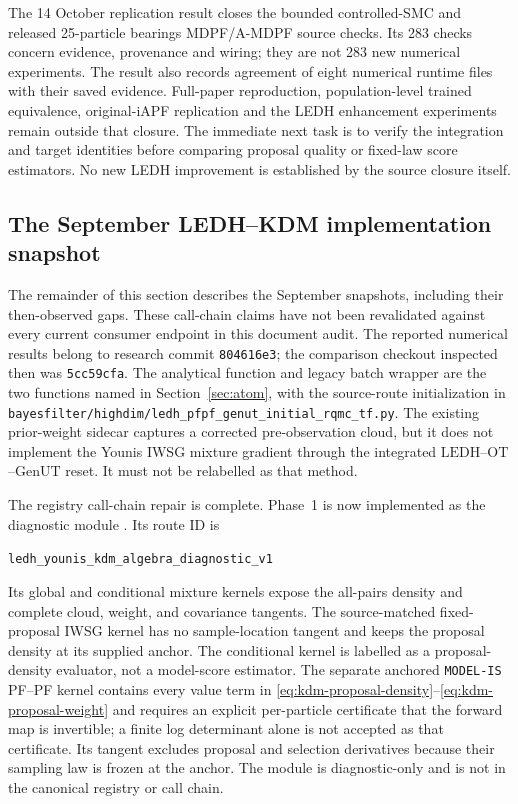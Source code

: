 \documentclass[11pt]{article}
\newcommand{\LEDH}{\ensuremath{\mathrm{LEDH}}}
\newcommand{\GenUT}{\ensuremath{\mathrm{GenUT}}}
\newcommand{\OT}{\ensuremath{\mathrm{OT}}}
\begin{document}
The 14 October replication result closes the bounded controlled-SMC and
released 25-particle bearings MDPF/A-MDPF source checks. Its 283 checks concern
evidence, provenance and wiring; they are not 283 new numerical experiments.
The result also records agreement of eight numerical runtime files with
their saved evidence. Full-paper reproduction, population-level trained
equivalence, original-iAPF replication and the LEDH enhancement experiments
remain outside that closure. The immediate next task is to verify the
integration and target identities before comparing proposal quality or
fixed-law score estimators. No new LEDH improvement is established by the
source closure itself.

\subsection{The September LEDH--KDM implementation snapshot}

The remainder of this section describes the September snapshots, including
their then-observed gaps. These call-chain claims have not been revalidated
against every current consumer endpoint in this document audit. The
reported numerical results belong to research commit \texttt{804616e3}; the
comparison checkout inspected then was \texttt{5cc59cfa}. The analytical
function and legacy batch wrapper are the two functions named in
Section~\ref{sec:atom}, with the source-route initialization in
\texttt{bayesfilter/highdim/ledh\_pfpf\_genut\_initial\_rqmc\_tf.py}.  The
existing prior-weight sidecar captures a corrected pre-observation cloud, but
it does not implement the Younis IWSG mixture gradient through the integrated
\LEDH{}--\OT{}--\GenUT{} reset.  It must not be relabelled as that method.

The registry call-chain repair is complete.  Phase~1 is now implemented as the
diagnostic module
.  Its route ID is
\begin{center}
\texttt{ledh\_younis\_kdm\_algebra\_}\texttt{diagnostic\_v1}
\end{center}
Its global and
conditional mixture kernels expose the all-pairs density and complete cloud,
weight, and covariance tangents.  The source-matched fixed-proposal IWSG
kernel has no sample-location tangent and keeps the proposal density at its
supplied anchor.  The conditional kernel is labelled as a proposal-density
evaluator, not a model-score estimator.  The separate anchored
\texttt{MODEL-IS} PF--PF kernel contains every value term in
\eqref{eq:kdm-proposal-density}--\eqref{eq:kdm-proposal-weight} and requires
an explicit per-particle certificate that the forward map is invertible; a
finite log determinant alone is not accepted as that certificate.  Its
tangent excludes proposal and selection derivatives because their sampling
law is frozen at the anchor.  The module is diagnostic-only and is not in the
canonical registry or call chain.
\end{document}
